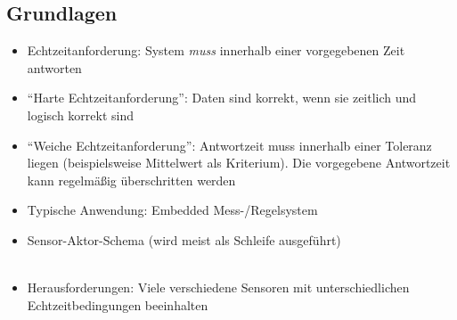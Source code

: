 \subsection{Grundlagen}
\begin{itemize}
	\item Echtzeitanforderung: System \textit{muss} innerhalb einer vorgegebenen Zeit antworten
	\item "`Harte Echtzeitanforderung"': Daten sind korrekt, wenn sie zeitlich und logisch korrekt sind
	\item "`Weiche Echtzeitanforderung"': Antwortzeit muss innerhalb einer Toleranz liegen (beispielsweise Mittelwert als Kriterium). Die vorgegebene Antwortzeit kann regelmäßig überschritten werden
	\item Typische Anwendung: Embedded Mess-/Regelsystem
	\item Sensor-Aktor-Schema (wird meist als Schleife ausgeführt)\\\\
	\item Herausforderungen: Viele verschiedene Sensoren mit unterschiedlichen Echtzeitbedingungen beeinhalten
\end{itemize}


